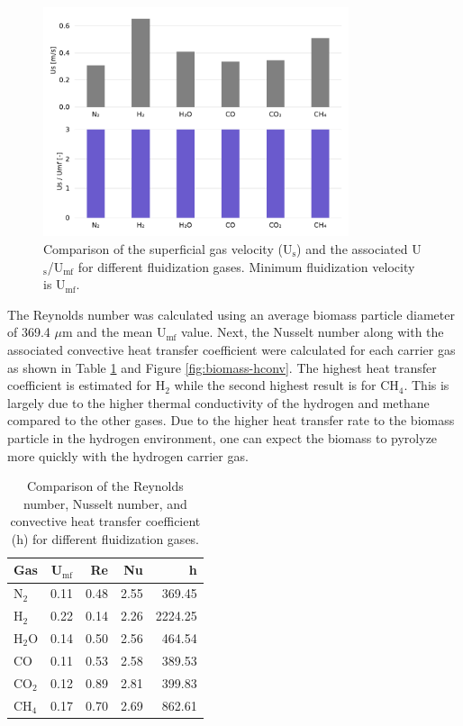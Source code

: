 \documentclass{article}
\begin{document}
\begin{figure}[H]
    \centering
    \includegraphics[width=0.8\textwidth]{figures/us-usumf-gases.pdf}
    \caption{Comparison of the superficial gas velocity (U$_\text{s}$) and the associated U$_\text{s}$/U$_\text{mf}$ for different fluidization gases. Minimum fluidization velocity is U$_\text{mf}$.}
    \label{fig:us-usumf-gases}
\end{figure}

The Reynolds number was calculated using an average biomass particle diameter of 369.4 $\mu$m and the mean U$_\text{mf}$ value. Next, the Nusselt number along with the associated convective heat transfer coefficient were calculated for each carrier gas as shown in Table \ref{tab:biomass-hconv} and Figure \ref{fig:biomass-hconv}. The highest heat transfer coefficient is estimated for H$_2$ while the second highest result is for CH$_4$. This is largely due to the higher thermal conductivity of the hydrogen and methane compared to the other gases. Due to the higher heat transfer rate to the biomass particle in the hydrogen environment, one can expect the biomass to pyrolyze more quickly with the hydrogen carrier gas.

\begin{table}[H]
    \centering
    \caption{Comparison of the Reynolds number, Nusselt number, and convective heat transfer coefficient (h) for different fluidization gases.}
    \label{tab:biomass-hconv}
    \begin{tabular}{lrrrr}
        \toprule
        Gas & U$_\text{mf}$ & Re & Nu & h \\
        \midrule
        N$_2$  & 0.11 & 0.48 & 2.55 & 369.45  \\
        H$_2$  & 0.22 & 0.14 & 2.26 & 2224.25 \\
        H$_2$O & 0.14 & 0.50 & 2.56 & 464.54  \\
        CO     & 0.11 & 0.53 & 2.58 & 389.53  \\
        CO$_2$ & 0.12 & 0.89 & 2.81 & 399.83  \\
        CH$_4$ & 0.17 & 0.70 & 2.69 & 862.61  \\
        \bottomrule
    \end{tabular}
\end{table}
\end{document}
